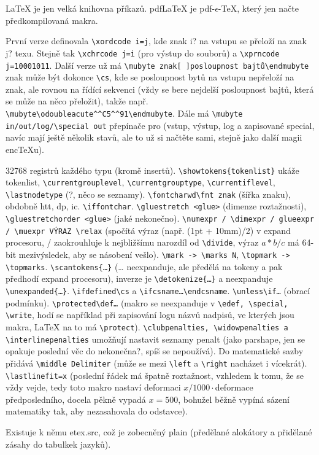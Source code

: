 \documentclass[12pt]{article}					%
\begin{document}
    \begin{upozorneni}
        LaTeX je jen velká knihovna příkazů. pdfLaTeX je pdf-$\epsilon$-TeX, který jen načte předkompilovaná makra.
    \end{upozorneni}

    \begin{definice}[encTeX]
        První verze definovala \verb|\xordcode i=j|, kde znak i? na vstupu se přeloží na znak j? texu. Stejně tak \verb|\xchrcode j=i| (pro výstup do souborů) a \verb|\xprncode j=10001011|. Další verze už má \verb|\mubyte znak[ ]posloupnost bajtů\endmubyte| znak může být dokonce \verb|\cs|, kde se posloupnost bytů na vstupu nepřeloží na znak, ale rovnou na řídící sekvenci (vždy se bere nejdelší posloupnost bajtů, která se může na něco přeložit), takže např. \verb|\mubyte\odoubleacute^^C5^^91\endmubyte|. Dále má \verb|\mubyte in/out/log/\special out| přepínače pro (vstup, výstup, log a zapisované special, navíc mají ještě několik stavů, ale to už si načtěte sami, stejně jako další magii encTeXu).
    \end{definice}

    \begin{definice}
        32768 registrů každého typu (kromě insertů). \verb|\showtokens{tokenlist}| ukáže tokenlist, \verb|\currentgrouplevel|, \verb|\currentgrouptype|, \verb|\currentiflevel|, \verb|\lastnodetype| (?, něco se seznamy). \verb|\fontcharwd\fnt znak| (šířka znaku), obdobně htt, dp, ic. \verb|\iffontchar|. \verb|\gluestretch <glue>| (dimenze roztažnosti), \verb|\gluestretchorder <glue>| (jaké nekonečno). \verb|\numexpr / \dimexpr / glueexpr / \muexpr VÝRAZ \relax| (spočítá výraz (např. (1pt + 10mm)/2) v expand procesoru, / zaokrouhluje k nejbližšímu narozdíl od \verb|\divide|, výraz $a*b/c$ má 64-bit mezivýsledek, aby se násobení vešlo). \verb|\mark -> \marks N|, \verb|\topmark -> \topmarks|. \verb|\scantokens{…}| (… neexpanduje, ale předělá na tokeny a pak předhodí expand procesoru), inverze je \verb|\detokenize{…}| a neexpanduje \verb|\unexpanded{…}|. \verb|\ifdefined\cs| a \verb|\ifcsname…\endcsname|. \verb|\unless\if…| (obrací podmínku). \verb|\protected\def…| (makro se neexpanduje v \verb|\edef, \special, \write|, hodí se například při zapisování logu názvů nadpisů, ve kterých jsou makra, LaTeX na to má \verb|\protect|). \verb|\clubpenalties, \widowpenalties a \interlinepenalties| umožňují nastavit seznamy penalt (jako parshape, jen se opakuje poslední věc do nekonečna?, spíš se nepoužívá). Do matematické sazby přidává \verb|\middle Delimiter| (může se mezi \verb|\left| a \verb|\right| nacházet i vícekrát). \verb|\lastlinefit=x| (poslední řádek má špatně roztažnost, vzhledem k tomu, že se vždy vejde, tedy toto makro nastaví deformaci $x/1000·$deformace předposledního, docela pěkně vypadá $x=500$, bohužel běžně vypíná sázení matematiky tak, aby nezasahovala do odstavce).

        Existuje k němu etex.src, což je zobecněný plain (předělané alokátory a přidělané zásahy do tabulkek jazyků).
    \end{definice}
\end{document}
